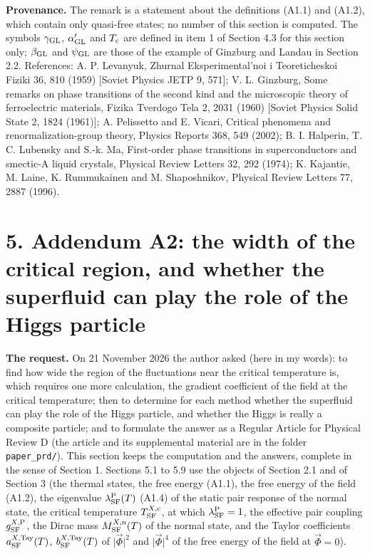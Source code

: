 \documentclass[
  10pt,
]{article}
\begin{document}
\textbf{Provenance.} The remark is a statement about the definitions
(A1.1) and (A1.2), which contain only quasi-free states; no number of
this section is computed. The symbols \(\gamma_{\rm GL}\),
\(\alpha'_{\rm GL}\) and \(T_{\rm c}\) are defined in item 1 of Section
4.3 for this section only; \(\beta_{\rm GL}\) and \(\psi_{\rm GL}\) are
those of the example of Ginzburg and Landau in Section 2.2. References:
A. P. Levanyuk, Zhurnal Eksperimental'noi i Teoreticheskoi Fiziki 36,
810 (1959) {[}Soviet Physics JETP 9, 571{]}; V. L. Ginzburg, Some
remarks on phase transitions of the second kind and the microscopic
theory of ferroelectric materials, Fizika Tverdogo Tela 2, 2031 (1960)
{[}Soviet Physics Solid State 2, 1824 (1961){]}; A. Pelissetto and E.
Vicari, Critical phenomena and renormalization-group theory, Physics
Reports 368, 549 (2002); B. I. Halperin, T. C. Lubensky and S.-k. Ma,
First-order phase transitions in superconductors and smectic-A liquid
crystals, Physical Review Letters 32, 292 (1974); K. Kajantie, M. Laine,
K. Rummukainen and M. Shaposhnikov, Physical Review Letters 77, 2887
(1996).

\hypertarget{addendum-a2-the-width-of-the-critical-region-and-whether-the-superfluid-can-play-the-role-of-the-higgs-particle}{%
\section{5. Addendum A2: the width of the critical region, and whether
the superfluid can play the role of the Higgs
particle}\label{addendum-a2-the-width-of-the-critical-region-and-whether-the-superfluid-can-play-the-role-of-the-higgs-particle}}

\textbf{The request.} On 21 November 2026 the author asked (here in my
words): to find how wide the region of the fluctuations near the
critical temperature is, which requires one more calculation, the
gradient coefficient of the field at the critical temperature; then to
determine for each method whether the superfluid can play the role of
the Higgs particle, and whether the Higgs is really a composite
particle; and to formulate the answer as a Regular Article for Physical
Review D (the article and its supplemental material are in the folder
\texttt{paper\_prd/}). This section keeps the computation and the
answers, complete in the sense of Section 1. Sections 5.1 to 5.9 use the
objects of Section 2.1 and of Section 3 (the thermal states, the free
energy (A1.1), the free energy of the field (A1.2), the eigenvalue
\(\lambda^{\rm P}_{\rm SF}(T)\) (A1.4) of the static pair response of
the normal state, the critical temperature \(T^{X,{\rm c}}_{\rm SF}\),
at which \(\lambda^{\rm P}_{\rm SF}=1\), the effective pair coupling
\(g^{X,{\rm P}}_{\rm SF}\), the Dirac mass \(M^{X,{\rm n}}_{\rm SF}(T)\)
of the normal state, and the Taylor coefficients
\(a^{X,{\rm Tay}}_{\rm SF}(T)\), \(b^{X,{\rm Tay}}_{\rm SF}(T)\) of
\(\lvert\vec\Phi\rvert^2\) and \(\lvert\vec\Phi\rvert^4\) of the free
energy of the field at \(\vec\Phi=0\)).
\end{document}

